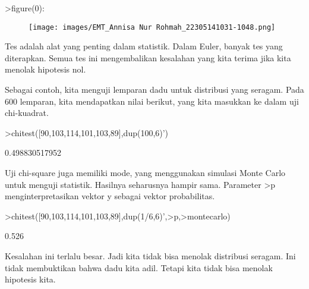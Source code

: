 \documentclass[a4paper,10pt]{article}
\begin{document}
\begin{eulernotebook}
\begin{eulercomment}
\begin{eulercomment}
\begin{eulercomment}
\begin{eulercomment}
\begin{eulerprompt}
>figure(0):
\end{eulerprompt}
\begin{figure}[h]
    \centering
    \texttt{[image: images/EMT\_Annisa Nur Rohmah\_22305141031-1048.png]}
\end{figure}
\begin{eulercomment}
Tes adalah alat yang penting dalam statistik. Dalam Euler, banyak tes
yang diterapkan. Semua tes ini mengembalikan kesalahan yang kita
terima jika kita menolak hipotesis nol.

Sebagai contoh, kita menguji lemparan dadu untuk distribusi yang
seragam. Pada 600 lemparan, kita mendapatkan nilai berikut, yang kita
masukkan ke dalam uji chi-kuadrat.
\end{eulercomment}
\begin{eulerprompt}
>chitest([90,103,114,101,103,89],dup(100,6)')
\end{eulerprompt}
\begin{euleroutput}
  0.498830517952
\end{euleroutput}
\begin{eulercomment}
Uji chi-square juga memiliki mode, yang menggunakan simulasi Monte
Carlo untuk menguji statistik. Hasilnya seharusnya hampir sama.
Parameter \textgreater{}p menginterpretasikan vektor y sebagai vektor probabilitas.
\end{eulercomment}
\begin{eulerprompt}
>chitest([90,103,114,101,103,89],dup(1/6,6)',>p,>montecarlo)
\end{eulerprompt}
\begin{euleroutput}
  0.526
\end{euleroutput}
\begin{eulercomment}
Kesalahan ini terlalu besar. Jadi kita tidak bisa menolak distribusi
seragam. Ini tidak membuktikan bahwa dadu kita adil. Tetapi kita tidak
bisa menolak hipotesis kita.


\end{eulercomment}
\end{eulercomment}
\end{eulercomment}
\end{eulercomment}
\end{eulercomment}
\end{eulernotebook}
\end{document}
